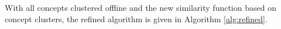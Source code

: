 With all concepts clustered offline and the new similarity function
based on concept clusters, the refined algorithm is given in
Algorithm \ref{alg:refined}.
%
